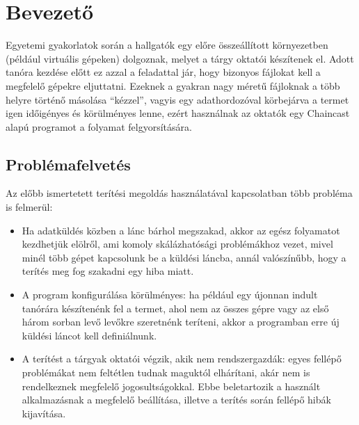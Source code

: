 \chapter{Bevezető} 

Egyetemi gyakorlatok során a hallgatók egy előre összeállított környezetben (például virtuális
gépeken) dolgoznak, melyet a tárgy oktatói készítenek el. Adott tanóra kezdése előtt 
ez azzal a feladattal jár, hogy bizonyos fájlokat kell a megfelelő gépekre eljuttatni. Ezeknek a gyakran nagy méretű fájloknak a több helyre történő másolása ``kézzel'', vagyis egy adathordozóval körbejárva a termet igen időigényes és körülményes lenne, ezért használnak az oktatók egy Chaincast\cite{kiraly2011chaincast} alapú programot a folyamat felgyorsítására. 

\section{Problémafelvetés}

Az előbb ismertetett terítési megoldás használatával kapcsolatban több probléma is felmerül:

\begin{itemize}
  \item Ha adatküldés közben a lánc bárhol megszakad, akkor az egész folyamatot kezdhetjük elölről, ami komoly skálázhatósági problémákhoz vezet, mivel minél több gépet kapcsolunk be a küldési láncba, annál valószínűbb, hogy a terítés meg fog szakadni egy hiba miatt.
   \item A program konfigurálása körülményes: ha például egy újonnan indult tanórára készítenénk fel a termet, ahol nem az összes gépre vagy az első három sorban levő levőkre szeretnénk teríteni, akkor a programban erre új küldési láncot kell definiálnunk.
   \item A terítést a tárgyak oktatói végzik, akik nem rendszergazdák: egyes fellépő problémákat nem feltétlen tudnak maguktól elhárítani, akár nem is rendelkeznek megfelelő jogosultságokkal. Ebbe beletartozik a használt alkalmazásnak a megfelelő beállítása, illetve a terítés során fellépő hibák kijavítása.
\end{itemize}

